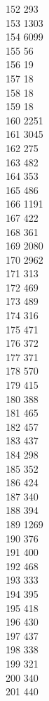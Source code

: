 { 152	293 \\
 153	1303 \\
 154	6099 \\
 155	56 \\
 156	19 \\
 157	18 \\
 158	18 \\
 159	18 \\
 160	2251 \\
 161	3045 \\
 162	275 \\
 163	482 \\
 164	353 \\
 165	486 \\
 166	1191 \\
 167	422 \\
 168	361 \\
 169	2080 \\
 170	2962 \\
 171	313 \\
 172	469 \\
 173	489 \\
 174	316 \\
 175	471 \\
 176	372 \\
 177	371 \\
 178	570 \\
 179	415 \\
 180	388 \\
 181	465 \\
 182	457 \\
 183	437 \\
 184	298 \\
 185	352 \\
 186	424 \\
 187	340 \\
 188	394 \\
 189	1269 \\
 190	376 \\
 191	400 \\
 192	468 \\
 193	333 \\
 194	395 \\
 195	418 \\
 196	430 \\
 197	437 \\
 198	338 \\
 199	321 \\
 200	340 \\
 201	440 \\
}
